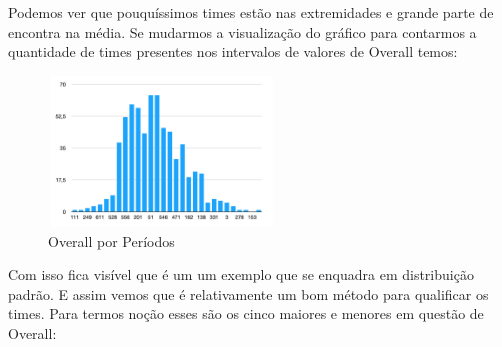 \documentclass{article}
\begin{document}
Podemos ver que pouquíssimos times estão nas extremidades e grande parte de encontra na média. Se  mudarmos a visualização do gráfico para contarmos a quantidade de times presentes nos intervalos de valores de Overall temos:
\begin{figure}[H]
    \centering
    \includegraphics[width=6cm,height=4cm]{Overall por Periodos.png}
    \caption{Overall por Períodos}
    \label{fig:my_label}
\end{figure}
Com isso fica visível que é um um exemplo que se enquadra em distribuição padrão. E assim vemos que é relativamente um bom método para qualificar os times. Para termos noção esses são os cinco maiores e menores em questão de Overall:
\begin{figure}[H]
\centering
{}
\end{figure} \\
\end{document}
